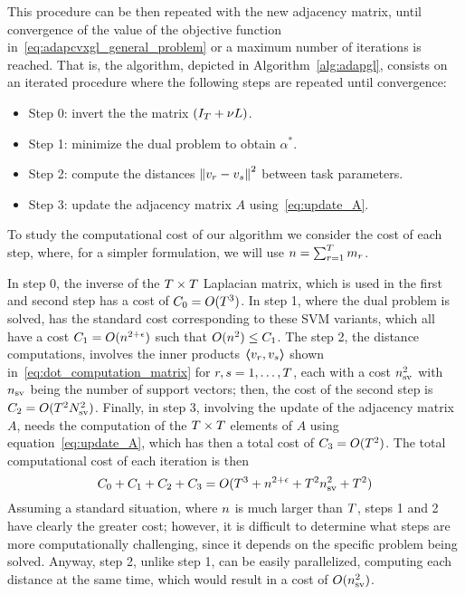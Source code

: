 This procedure can be then repeated with the new adjacency matrix, until convergence of the value of the objective function in~\eqref{eq:adapcvxgl_general_problem} or a maximum number of iterations is reached. That is, the algorithm, depicted in Algorithm~\ref{alg:adapgl}, consists on an iterated procedure where the following steps are repeated until convergence:
\begin{itemize}
    \item Step 0: invert the the matrix $(I_T + \nu L)$.
    \item Step 1: minimize the dual problem to obtain $\alpha^*$.
    \item Step 2: compute the distances $\left\lVert v_r - v_s\right\rVert^2$ between task parameters.
    \item Step 3: update the adjacency matrix $A$ using~\eqref{eq:update_A}.
\end{itemize}


To study the computational cost of our algorithm we consider the cost of each step, where, for a simpler formulation, we will use $n = \sum_{r=1}^T m_r$.

  In step 0, the inverse of the $T \times T$ Laplacian matrix, which is used in the first and second step has a cost of $C_0 = O(T^3)$.
%
In step 1, where the dual problem is solved, has the standard cost corresponding to these SVM variants, which all have a cost $C_1 = O(n^{2+\epsilon})$ such that $O(n^2) \leq C_1$.
%
The step 2, the distance computations, involves the inner products $\bm{\left\langle} v_r, v_s \bm{\right\rangle}$ shown in~\eqref{eq:dot_computation_matrix} for $r,s=1, \ldots, T$, each with a cost $n_{\text{sv}}^2$ with $n_{\text{sv}}$ being the number of support vectors; then, the cost of the second step is $C_2 = O(T^2 N_\text{sv}^2)$. 
%
Finally, in step 3, involving the update of the adjacency matrix $A$, needs the computation of the $T \times T$ elements of $A$ using equation~\eqref{eq:update_A}, which has then a total cost of $C_3 = O(T^2)$.
%
The total computational cost of each iteration is then
$$ C_0 + C_1 + C_2 + C_3 = O(T^3 + n^{2+\epsilon} + T^2 n_\text{sv}^2 + T^2)$$
%
Assuming a standard situation, where $n$ is much larger than $T$, steps 1 and 2 have clearly the greater cost; however, it is difficult to determine what steps are more computationally challenging, since it depends on the specific problem being solved. Anyway, step 2, unlike step 1, can be easily parallelized, computing each distance at the same time, which would result in a cost of $O(n_\text{sv}^2)$. 

